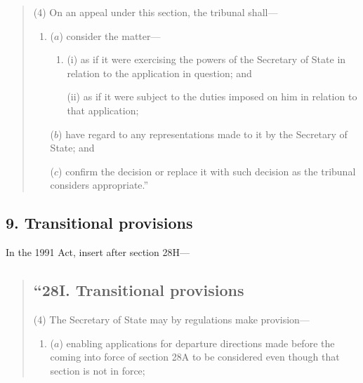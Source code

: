 \documentclass[a4paper]{article}
\begin{document}
{\begin{quotation}
(4) On an appeal under this section, the tribunal shall—
\begin{enumerate}\item[]
($a$) consider the matter—
\begin{enumerate}\item[]
(i) as if it were exercising the powers of the Secretary of State in relation to the application in question; and

(ii) as if it were subject to the duties imposed on him in relation to that application;
\end{enumerate}

($b$) have regard to any representations made to it by the Secretary of State; and

($c$) confirm the decision or replace it with such decision as the tribunal considers appropriate.”
\end{enumerate}
\end{quotation}

\subsection{9. Transitional provisions}

In the 1991 Act, insert after section 28H—
\begin{quotation}
\subsection*{“28I. Transitional provisions}
%
%
%
%

(4) The Secretary of State may by regulations make provision—
\begin{enumerate}\item[]
($a$) enabling applications for departure directions made before the coming into force of section 28A to be considered even though that section is not in force;


\end{enumerate}
\end{quotation}}
\end{document}
